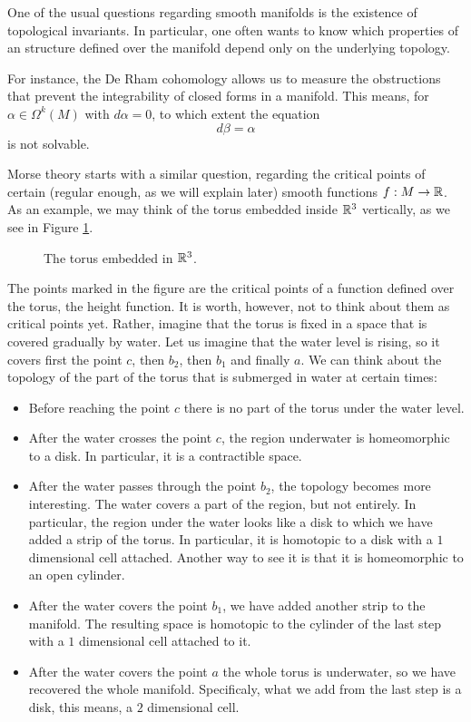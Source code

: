 One of the usual questions regarding smooth manifolds is the existence of topological invariants. In particular, one often wants to know which properties of an structure defined over the manifold depend only on the underlying topology.

For instance, the De Rham cohomology allows us to measure the obstructions that prevent the integrability of closed forms in a manifold. This means, for $\alpha \in \Omega^k(M)$ with $d\alpha = 0$, to which extent the equation
\[d\beta = \alpha\]
is not solvable.

Morse theory starts with a similar question, regarding the critical points of certain (regular enough, as we will explain later) smooth functions $f : M \rightarrow \mathbb{R}$. As an example, we may think of the torus embedded inside $\mathbb{R}^3$ vertically, as we see in Figure \ref{figure:torus}.

\begin{figure}[h]
	\centering
	
	\caption{The torus embedded in $\mathbb{R}^3$.}
	\label{figure:torus}
\end{figure}

The points marked in the figure are the critical points of a function defined over the torus, the height function. It is worth, however, not to think about them as critical points yet. Rather, imagine that the torus is fixed in a space that is covered gradually by water. Let us imagine that the water level is rising, so it covers first the point $c$, then $b_2$, then $b_1$ and finally $a$. We can think about the topology of the part of the torus that is submerged in water at certain times:

\begin{itemize}
	\item Before reaching the point $c$ there is no part of the torus under the water level.
	\item After the water crosses the point $c$, the region underwater is homeomorphic to a disk. In particular, it is a contractible space.
	\item After the water passes through the point $b_2$, the topology becomes more interesting. The water covers a part of the region, but not entirely. In particular, the region under the water looks like a disk to which we have added a strip of the torus. In particular, it is homotopic to a disk with a $1$ dimensional cell attached. Another way to see it is that it is homeomorphic to an open cylinder.
	\item After the water covers the point $b_1$, we have added another strip to the manifold. The resulting space is homotopic to the cylinder of the last step with a $1$ dimensional cell attached to it.
	\item After the water covers the point $a$ the whole torus is underwater, so we have recovered the whole manifold. Specificaly, what we add from the last step is a disk, this means, a $2$ dimensional cell.
\end{itemize}

